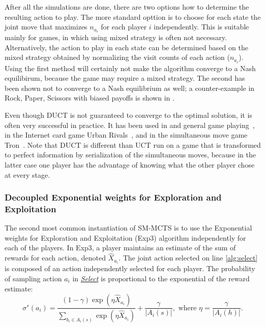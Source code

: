 After all the simulations are done, there are two options how to determine the resulting action to play. The more standard opttion is to choose for each state the joint move that maximizes $n_{a_i}$ for each player $i$ independently.
This is suitable mainly for games, in which using mixed strategy is often not necessary.
Alternatively, the action to play in each state can be determined based on the mixed strategy obtained by normalizing the visit counts of each action ($n_{a_i}$).
Using the first method will certainly not make the algorithm converge to a Nash equilibirum, because the game may require a mixed strategy.
The second has been shown not to converge to a Nash equilibrium as well; a counter-example in Rock, Paper, Scissors with biased payoffs is shown in \cite{Shafei09}. 

Even though DUCT is not guaranteed to converge to the optimal solution, it is often very successful in practice.
It has been used in and general game playing~\cite{Finnsson12}, in the Internet card game Urban Rivals~\cite{Teytaud11Upper},
and in the simultaneous move game Tron~\cite{Perick12Comparison}. 
Note that DUCT is different than UCT run on a game that is transformed to perfect information by serialization of the simultaneous moves, 
because in the latter case one player has the advantage of knowing what the other player chose at every stage.


\subsubsection{Decoupled Exponential weights for Exploration and Exploitation}\label{sec:exp3}

The second most common instantiation of SM-MCTS is to use the Exponential weights for Exploration and Exploitation (Exp3) algorithm \cite{Auer2003Exp3} independently for each of the players. In Exp3, a player maintains an estimate of the sum of rewards for each action, denoted $\hat{X}_{a_i}$. The joint action selected on line \ref{alg:select} is composed of an action independently selected for each player. The probability of sampling action $a_i$ in \emph{\underline{Select}} is proportional to the exponential of the reward estimate:
\begin{equation}\label{eq:exp3select}
\sigma^s(a_i) = \frac{(1-\gamma) \exp(\eta \hat{X}_{a_i})}{\sum_{b_i \in A_i(s)} \exp(\eta \hat{X}_{a_i})} + \frac{\gamma}{|A_i(s)|},
  \mbox{ where } \eta = \frac{\gamma}{|A_i(h)|}.
\end{equation}

